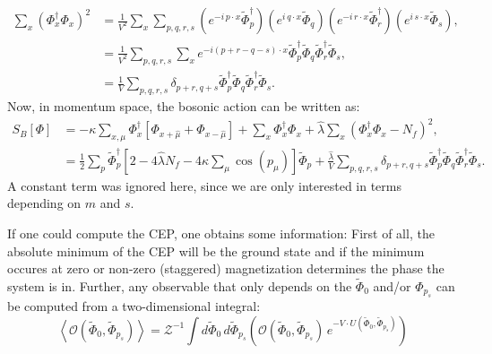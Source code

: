 % 
\begin{align}
 \sum\limits_{x} \left( \Phi_x^{\dagger} \Phi_x \right)^2 &= 
                     \frac{1}{V^2}  \sum\limits_{x}  \sum\limits_{p,q,r,s}  
                     \left( e^{-i\, p \cdot x}  \tilde\Phi_p^{\dagger} \right) \left( e^{i\, q \cdot x}  \tilde\Phi_{q} \right)
                     \left( e^{-i\, r \cdot x}  \tilde\Phi_r^{\dagger} \right) \left( e^{i\, s \cdot x}  \tilde\Phi_{s} \right), \nonumber \\
                  &= \frac{1}{V^2}  \sum\limits_{p,q,r,s}  
                     \sum\limits_{x}  e^{ -i (p + r - q - s) \cdot x }  \tilde\Phi_p^{\dagger} \tilde\Phi_q \tilde\Phi_r^{\dagger} \tilde\Phi_s,
                     \nonumber \\
                  &= \frac{1}{V}\sum\limits_{p,q,r,s} \delta_{p+r,q+s} \tilde\Phi_p^{\dagger} \tilde\Phi_q \tilde\Phi_r^{\dagger} \tilde\Phi_s 
                      \label{eq:FourierTrafoPhiToTheFour}.
\end{align}
%
Now, in momentum space, the bosonic action can be written as:
\begin{align}
 S_B[\Phi] &= -\kappa  \sum\limits_{x,\mu}  \Phi_x^{\dagger}  \left[ \Phi_{x+\hat\mu} + \Phi_{x-\hat\mu} \right] 
              + \sum\limits_x \Phi_x^{\dagger} \Phi_x 
              + \hat{\lambda}  \sum\limits_x \left( \Phi_x^{\dagger} \Phi_x - N_f\right)^2, \nonumber \\
           &=  \frac{1}{2}  \sum\limits_{p}  \tilde\Phi_p^{\dagger}  
              \left[ 2 - 4 \hat\lambda N_f - 4 \kappa \sum_{\mu} \cos(p_{\mu}) \right]  \tilde\Phi_p
              + \frac{\hat\lambda}{V} \sum\limits_{p,q,r,s} \delta_{p+r,q+s} \tilde\Phi_p^{\dagger} \tilde\Phi_q \tilde\Phi_r^{\dagger} \tilde\Phi_s .
\end{align}
A constant term was ignored here, since we are only interested in terms depending on $m$ and $s$.
%
% 

If one could compute the CEP, one obtains some information: First of all, the absolute minimum of the CEP will be the ground state and if the 
minimum occures at zero or non-zero (staggered) magnetization determines the phase the system is in. Further, any observable that only depends on 
the $\tilde \Phi_0$ and/or $\Phi_{p_s}$ can be computed from a two-dimensional integral:
\begin{equation}\label{eq:obsFromCEP}
 \left< \mathcal{O}(\tilde \Phi_0,\tilde \Phi_{p_s}) \right > = 
      \mathcal{Z}^{-1} \int d \tilde \Phi_0\, d \tilde \Phi_{p_s} 
      \left( \mathcal{O}(\tilde \Phi_0,\tilde \Phi_{p_s})\, e^{-V\cdot U(\tilde \Phi_0,\tilde \Phi_{p_s})} \right)
\end{equation}
